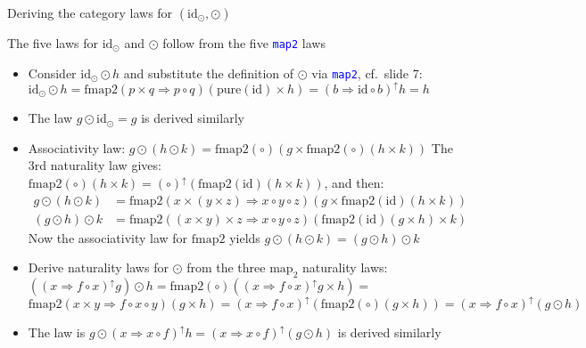 \documentclass[english]{beamer}
\begin{document}
\begin{frame}{Deriving the category laws for $\left(\text{id}_{\odot},\odot\right)$}

\vspace{-0.10cm}The five laws for $\text{id}_{\odot}$ and $\odot$
follow from the five \texttt{\textcolor{blue}{\footnotesize{}map2}}
laws
\begin{itemize}
\item Consider $\text{id}_{\odot}\odot h$ and substitute the definition
of $\odot$ via \texttt{\textcolor{blue}{\footnotesize{}map2}}, cf.\ slide
7: $\text{id}_{\odot}\odot h=\text{fmap2}\left(p\times q\Rightarrow p\circ q\right)\left(\text{pure}\left(\text{id}\right)\times h\right)=\left(b\Rightarrow\text{id}\circ b\right)^{\uparrow}h=h$
\item The law $g\odot\text{id}_{\odot}=g$ is derived similarly
\item Associativity law: {\footnotesize{}$g\odot\left(h\odot k\right)=\text{fmap2}\left(\circ\right)\left(g\times\text{fmap2}\left(\circ\right)\left(h\times k\right)\right)$}
The 3rd naturality law gives:{\footnotesize{} $\text{fmap2}\left(\circ\right)\left(h\times k\right)=\left(\circ\right)^{\uparrow}\left(\text{fmap2}\left(\text{id}\right)\left(h\times k\right)\right)$},
and then:{\footnotesize{}
\begin{align*}
g\odot\left(h\odot k\right) & =\text{fmap2}\left(x\times\left(y\times z\right)\Rightarrow x\circ y\circ z\right)\left(g\times\text{fmap2}\left(\text{id}\right)\left(h\times k\right)\right)\\
\left(g\odot h\right)\odot k & =\text{fmap2}\left(\left(x\times y\right)\times z\Rightarrow x\circ y\circ z\right)\left(\text{fmap2}\left(\text{id}\right)\left(g\times h\right)\times k\right)
\end{align*}
}Now the associativity law for{\footnotesize{} $\text{fmap2}$ }yields
{\footnotesize{}$g\odot\left(h\odot k\right)=\left(g\odot h\right)\odot k$}{\footnotesize \par}
\item Derive naturality laws for $\odot$ from the three {\footnotesize{}$\text{map}_{2}$}
naturality laws: {\footnotesize{}$\left((x\Rightarrow f\circ x)^{\uparrow}g\right)\odot h=\text{fmap2}\left(\circ\right)\left((x\Rightarrow f\circ x)^{\uparrow}g\times h\right)=$
$\text{fmap2}\left(x\times y\Rightarrow f\circ x\circ y\right)\left(g\times h\right)=\left(x\Rightarrow f\circ x\right)^{\uparrow}\left(\text{fmap2}\left(\circ\right)\left(g\times h\right)\right)=\left(x\Rightarrow f\circ x\right)^{\uparrow}\left(g\odot h\right)$}{\footnotesize \par}
\item The law is {\footnotesize{}$g\odot(x\Rightarrow x\circ f)^{\uparrow}h=(x\Rightarrow x\circ f)^{\uparrow}\left(g\odot h\right)$}
is derived similarly
\end{itemize}
\end{frame}
\end{document}
